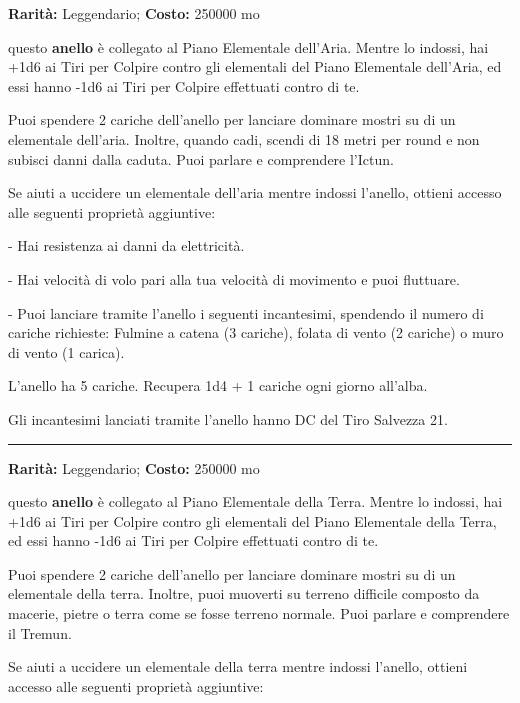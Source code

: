 \begin{multicols}{2}
\textbf{Rarità:} Leggendario; \textbf{Costo:} 250000 mo

questo \textbf{anello} è collegato al Piano Elementale dell'Aria. Mentre lo indossi, hai +1d6 ai Tiri per Colpire contro gli elementali del Piano Elementale dell'Aria, ed essi hanno -1d6 ai Tiri per Colpire effettuati contro di te.

Puoi spendere 2 cariche dell'anello per lanciare dominare mostri su di un elementale dell'aria. Inoltre, quando cadi, scendi di 18 metri per round e non subisci danni dalla caduta. Puoi parlare e comprendere l'Ictun.

Se aiuti a uccidere un elementale dell'aria mentre indossi l'anello, ottieni accesso alle seguenti proprietà aggiuntive:

\smallskip- Hai resistenza ai danni da elettricità.

\smallskip- Hai velocità di volo pari alla tua velocità di movimento e puoi fluttuare.

\smallskip- Puoi lanciare tramite l'anello i seguenti incantesimi, spendendo il numero di cariche richieste: Fulmine a catena (3 cariche), folata di vento (2 cariche) o muro di vento (1 carica).

\medskip

L'anello ha 5 cariche. Recupera 1d4 + 1 cariche ogni giorno all'alba.

Gli incantesimi lanciati tramite l'anello hanno DC del Tiro Salvezza 21.

\smallskip\noindent\rule{\linewidth}{2pt}  \hypertarget{AnellodegliElementalidellaTerra}{}\medskip{}\noindent\label{AnellodegliElementalidellaTerra}

\textbf{Rarità:} Leggendario; \textbf{Costo:} 250000 mo

questo \textbf{anello} è collegato al Piano Elementale della Terra. Mentre lo indossi, hai +1d6 ai Tiri per Colpire contro gli elementali del Piano Elementale della Terra, ed essi hanno -1d6 ai Tiri per Colpire effettuati contro di te.

Puoi spendere 2 cariche dell'anello per lanciare dominare mostri su di un elementale della terra. Inoltre, puoi muoverti su terreno difficile composto da macerie, pietre o terra come se fosse terreno normale. Puoi parlare e comprendere il Tremun.

Se aiuti a uccidere un elementale della terra mentre indossi l'anello, ottieni accesso alle seguenti proprietà aggiuntive:


\end{multicols}
